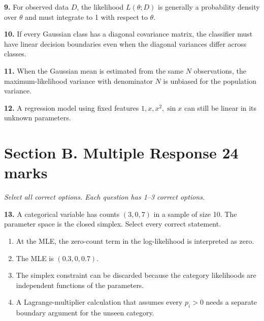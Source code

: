 \documentclass[11pt,a4paper]{article}
\begin{document}
\par\noindent\begin{minipage}{\linewidth}
\textbf{9.} For observed data \(D\), the likelihood \(L(\theta;D)\) is generally a probability density over \(\theta\) and must integrate to 1 with respect to \(\theta\).
\end{minipage}\par\vspace{3mm}
\par\noindent\begin{minipage}{\linewidth}
\textbf{10.} If every Gaussian class has a diagonal covariance matrix, the classifier must have linear decision boundaries even when the diagonal variances differ across classes.
\end{minipage}\par\vspace{3mm}
\par\noindent\begin{minipage}{\linewidth}
\textbf{11.} When the Gaussian mean is estimated from the same \(N\) observations, the maximum-likelihood variance with denominator \(N\) is unbiased for the population variance.
\end{minipage}\par\vspace{3mm}
\par\noindent\begin{minipage}{\linewidth}
\textbf{12.} A regression model using fixed features \(1,x,x^2,\sin x\) can still be linear in its unknown parameters.
\end{minipage}\par\vspace{3mm}
\newpage\section*{Section B. Multiple Response \hfill 24 marks}
\textit{Select all correct options. Each question has 1--3 correct options.}\par
\par\noindent\begin{minipage}{\linewidth}
\textbf{13.} A categorical variable has counts \((3,0,7)\) in a sample of size 10. The parameter space is the closed simplex. Select every correct statement.
\begin{enumerate}[label=(\Alph*),leftmargin=8mm,itemsep=2pt,topsep=2pt]
\item At the MLE, the zero-count term in the log-likelihood is interpreted as zero.
\item The MLE is \((0.3,0,0.7)\).
\item The simplex constraint can be discarded because the category likelihoods are independent functions of the parameters.
\item A Lagrange-multiplier calculation that assumes every \(p_i>0\) needs a separate boundary argument for the unseen category.
\end{enumerate}

\end{minipage}\par\vspace{3mm}
\end{document}
